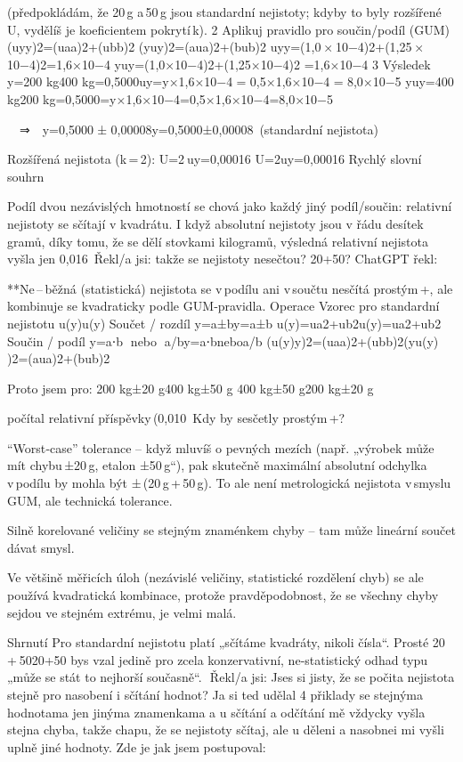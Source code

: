 {(předpokládám, že 20 g a 50 g jsou standardní nejistoty; kdyby to byly rozšířené U, vydělíš je koeficientem pokrytí k).
2  Aplikuj pravidlo pro součin/podíl (GUM)
(uyy)2=(uaa)2+(ubb)2
(yuy​​)2=(aua​​)2+(bub​​)2
uyy=(1,0 ⁣× ⁣10−4)2+(1,25 ⁣× ⁣10−4)2=1,6×10−4
yuy​​=(1,0×10−4)2+(1,25×10−4)2
​=1,6×10−4
3  Výsledek
y=200 kg400 kg=0,5000uy=y×1,6×10−4  =  0,5×1,6×10−4  =  8,0×10−5
yuy​​=400 kg200 kg​=0,5000=y×1,6×10−4=0,5×1,6×10−4=8,0×10−5​

 ⇒ y=0,5000  ±  0,00008y=0,5000±0,00008  (standardní nejistota)

Rozšířená nejistota (k = 2):
U=2 uy=0,00016
U=2uy​=0,00016
Rychlý slovní souhrn

Podíl dvou nezávislých hmotností se chová jako každý jiný podíl/součin:
relativní nejistoty se sčítají v kvadrátu. I když absolutní nejistoty jsou v řádu desítek gramů, díky tomu, že se dělí stovkami kilogramů, výsledná relativní nejistota vyšla jen 0,016 %
Řekl/a jsi:
takže se nejistoty nesečtou? 20+50?
ChatGPT řekl:

**Ne – běžná (statistická) nejistota se v podílu ani v součtu nesčítá prostým +, ale kombinuje se kvadraticky podle GUM‑pravidla.
Operace	Vzorec pro standardní nejistotu u(y)u(y)
Součet / rozdíl y=a±by=a±b	u(y)=ua2+ub2u(y)=ua2​+ub2​
​
Součin / podíl y=a⋅b    nebo    a/by=a⋅bneboa/b	(u(y)y)2=(uaa)2+(ubb)2(yu(y)​)2=(aua​​)2+(bub​​)2

Proto jsem pro:
200 kg±20 g400 kg±50 g
400 kg±50 g200 kg±20 g​

počítal relativní příspěvky (0,010 %
Kdy by sesčetly prostým +?

    “Worst‑case” tolerance – když mluvíš o pevných mezích (např. „výrobek může mít chybu ±20 g, etalon ±50 g“), pak skutečně maximální absolutní odchylka v podílu by mohla být ± (20 g + 50 g).
    To ale není metrologická nejistota v smyslu GUM, ale technická tolerance.

    Silně korelované veličiny se stejným znaménkem chyby – tam může lineární součet dávat smysl.

Ve většině měřicích úloh (nezávislé veličiny, statistické rozdělení chyb) se ale používá kvadratická kombinace, protože pravděpodobnost, že se všechny chyby sejdou ve stejném extrému, je velmi malá.

Shrnutí
Pro standardní nejistotu platí „sčítáme kvadráty, nikoli čísla“. Prosté 20 + 5020+50 bys vzal jedině pro zcela konzervativní, ne‑statistický odhad typu „může se stát to nejhorší současně“. ​
Řekl/a jsi:
Jses si jisty, že se počita nejistota stejně pro nasobení i sčítání hodnot? Ja si ted udělal 4 přiklady se stejnýma hodnotama jen jinýma znamenkama a u sčítání a odčítání mě vždycky vyšla stejna chyba, takže chapu, že se nejistoty sčítaj, ale u děleni a nasobnei mi vyšli uplně jiné hodnoty. Zde je jak jsem postupoval:

}
